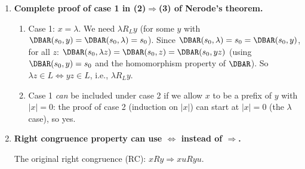 \begin{enumerate}[{2.}1.]
\begin{enumerate}
This contradicts Theorem 2.3. Therefore $L_4$ is not FAD.

\item $L_5$ = odd-length, center letter matches none of the others: Not FAD.
Suppose $L_5$ were FAD, and let $p$ be a pumping length.
Take
\[
w=\mathbf{a}^p\mathbf{b}\mathbf{a}^p.
\]
This word has odd length, its center letter is $\mathbf b$, and that $\mathbf b$ appears
nowhere else, so $w\in L_5$.

For any split $w=uvw'$ with $|uv|\le p$ and $|v|\ge1$, again $v=\mathbf a^k$ for some
$k\ge1$.
Pumping down gives
\[
uw'=\mathbf{a}^{p-k}\mathbf{b}\mathbf{a}^p.
\]
If $k$ is odd, then $|uw'|=2p+1-k$ is even, so $uw'\notin L_5$.
If $k=2r$ is even, then the center position of $uw'$ is
\[
\frac{|uw'|+1}{2}=p+1-r.
\]
But the unique $\mathbf b$ is at position $p-2r+1$, so the center lies strictly to the
right of that $\mathbf b$, inside the final $\mathbf a$-block. Thus the center letter is
$\mathbf a$, which certainly matches other letters of the word. Hence $uw'\notin L_5$.

This contradicts Theorem 2.3. Therefore $L_5$ is not FAD.
\end{enumerate}

\item \textbf{Complete proof of case 1 in (2)$\Rightarrow$(3) of Nerode's theorem.}

\begin{enumerate}
\item Case 1: $x=\lambda$. We need $\lambda R_L y$ (for some $y$ with $\DBAR(s_0,y)=\DBAR(s_0,\lambda)=s_0$). Since $\DBAR(s_0,\lambda)=s_0=\DBAR(s_0,y)$, for all $z$: $\DBAR(s_0,\lambda z)=\DBAR(s_0,z)=\DBAR(s_0,yz)$ (using $\DBAR(s_0,y)=s_0$ and the homomorphism property of $\DBAR$). So $\lambda z\in L\Leftrightarrow yz\in L$, i.e., $\lambda R_L y$.

\item Case 1 \emph{can} be included under case 2 if we allow $x$ to be a prefix of $y$ with $|x|=0$: the proof of case 2 (induction on $|x|$) can start at $|x|=0$ (the $\lambda$ case), so yes.
\end{enumerate}

\item \textbf{Right congruence property can use $\Leftrightarrow$ instead of $\Rightarrow$.}

The original right congruence (RC): $xRy\Rightarrow xuRyu$.


\end{enumerate}

